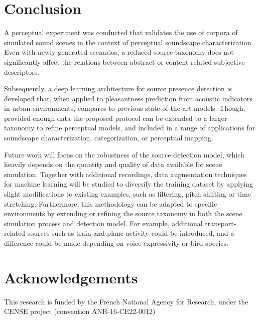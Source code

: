 \documentclass[11pt,a4paper]{article}
\begin{document}
\section{Conclusion}
\label{sec:conclusion}

A perceptual experiment was conducted that validates the use of corpora of simulated sound scenes in the context of perceptual soundscape characterization. Even with newly generated scenarios, a reduced source taxonomy does not significantly affect the relations between abstract or content-related subjective descriptors.

Subsequently, a deep learning architecture for source presence detection is developed that, when applied to pleasantness prediction from acoustic indicators in urban environments, compares to previous state-of-the-art models. Though, provided enough data the proposed protocol can be extended to a larger taxonomy to refine perceptual models, and included in a range of applications for soundscape characterization, categorization, or perceptual mapping.

Future work will focus on the robustness of the source detection model, which heavily depends on the quantity and quality of data available for scene simulation. Together with additional recordings, data augmentation techniques for machine learning will be studied to diversify the training dataset by applying slight modifications to existing examples, such as filtering, pitch shifting or time stretching. Furthermore, this methodology can be adapted to specific environments by extending or refining the source taxonomy in both the scene simulation process and detection model. For example, additional transport-related sources such as train and plane activity could be introduced, and a difference could be made depending on voice expressivity or bird species.

\section*{Acknowledgements}
\label{sec:ack}

This research is funded by the French National Agency for Research, under the CENSE project (convention ANR-16-CE22-0012)




\end{document}
